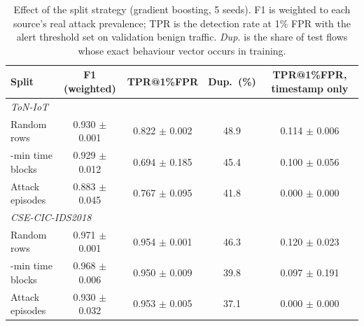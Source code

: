 \begin{table}[t]
\centering
\small
\caption{Effect of the split strategy (gradient boosting, 5 seeds). F1 is weighted to each source's real attack prevalence; TPR is the detection rate at 1\% FPR with the alert threshold set on validation benign traffic. \emph{Dup.} is the share of test flows whose exact behaviour vector occurs in training.}
\label{tab:splits}
\begin{tabular}{lcccc}
\toprule
Split & F1 (weighted) & TPR@1\%FPR & Dup.\ (\%) & TPR@1\%FPR, timestamp only \\
\midrule
\multicolumn{5}{l}{\textit{ToN-IoT}} \\
\quad Random rows & 0.930 $\pm$ 0.001 & 0.822 $\pm$ 0.002 & 48.9 & 0.114 $\pm$ 0.006 \\
\quad 10-min time blocks & 0.929 $\pm$ 0.012 & 0.694 $\pm$ 0.185 & 45.4 & 0.100 $\pm$ 0.056 \\
\quad Attack episodes & 0.883 $\pm$ 0.045 & 0.767 $\pm$ 0.095 & 41.8 & 0.000 $\pm$ 0.000 \\
\multicolumn{5}{l}{\textit{CSE-CIC-IDS2018}} \\
\quad Random rows & 0.971 $\pm$ 0.001 & 0.954 $\pm$ 0.001 & 46.3 & 0.120 $\pm$ 0.023 \\
\quad 10-min time blocks & 0.968 $\pm$ 0.006 & 0.950 $\pm$ 0.009 & 39.8 & 0.097 $\pm$ 0.191 \\
\quad Attack episodes & 0.930 $\pm$ 0.032 & 0.953 $\pm$ 0.005 & 37.1 & 0.000 $\pm$ 0.000 \\
\bottomrule
\end{tabular}
\end{table}
